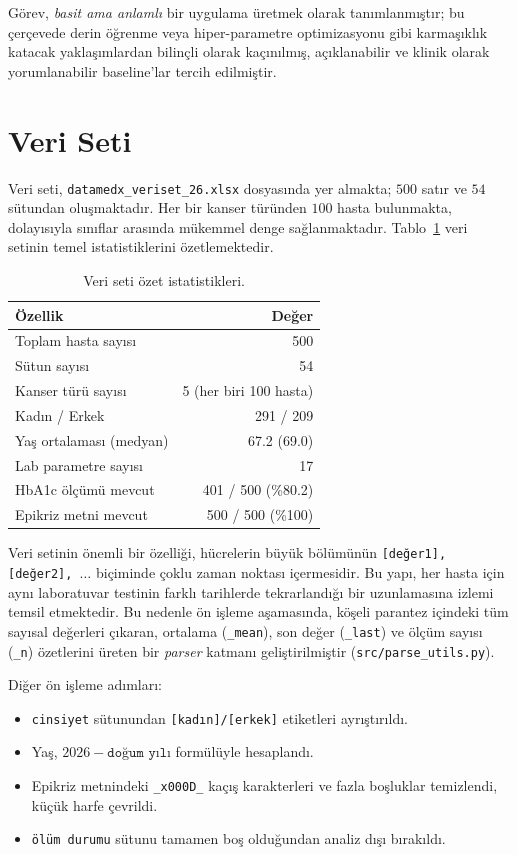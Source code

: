 \documentclass[11pt,a4paper]{article}
\begin{document}
Görev, \emph{basit ama anlamlı} bir uygulama üretmek olarak tanımlanmıştır; bu çerçevede derin öğrenme veya hiper-parametre optimizasyonu gibi karmaşıklık katacak yaklaşımlardan bilinçli olarak kaçınılmış, açıklanabilir ve klinik olarak yorumlanabilir baseline'lar tercih edilmiştir.

\section{Veri Seti}

Veri seti, \texttt{datamedx\_veriset\_26.xlsx} dosyasında yer almakta; $500$ satır ve $54$ sütundan oluşmaktadır. Her bir kanser türünden $100$ hasta bulunmakta, dolayısıyla sınıflar arasında mükemmel denge sağlanmaktadır. Tablo~\ref{tab:dataset} veri setinin temel istatistiklerini özetlemektedir.

\begin{table}[htbp]
\centering
\caption{Veri seti özet istatistikleri.}
\label{tab:dataset}
\small
\begin{tabular}{lr}
\toprule
\textbf{Özellik} & \textbf{Değer} \\
\midrule
Toplam hasta sayısı & 500 \\
Sütun sayısı & 54 \\
Kanser türü sayısı & 5 (her biri 100 hasta) \\
Kadın / Erkek & 291 / 209 \\
Yaş ortalaması (medyan) & 67.2 (69.0) \\
Lab parametre sayısı & 17 \\
HbA1c ölçümü mevcut & 401 / 500 (\%80.2) \\
Epikriz metni mevcut & 500 / 500 (\%100) \\
\bottomrule
\end{tabular}
\end{table}

Veri setinin önemli bir özelliği, hücrelerin büyük bölümünün \texttt{[değer1], [değer2], $\ldots$} biçiminde çoklu zaman noktası içermesidir. Bu yapı, her hasta için aynı laboratuvar testinin farklı tarihlerde tekrarlandığı bir uzunlamasına izlemi temsil etmektedir. Bu nedenle ön işleme aşamasında, köşeli parantez içindeki tüm sayısal değerleri çıkaran, ortalama (\texttt{\_mean}), son değer (\texttt{\_last}) ve ölçüm sayısı (\texttt{\_n}) özetlerini üreten bir \emph{parser} katmanı geliştirilmiştir (\texttt{src/parse\_utils.py}).

Diğer ön işleme adımları:
\begin{itemize}[leftmargin=1.5em,itemsep=1pt]
    \item \texttt{cinsiyet} sütunundan \texttt{[kadın]/[erkek]} etiketleri ayrıştırıldı.
    \item Yaş, $2026 - \texttt{doğum yılı}$ formülüyle hesaplandı.
    \item Epikriz metnindeki \texttt{\_x000D\_} kaçış karakterleri ve fazla boşluklar temizlendi, küçük harfe çevrildi.
    \item \texttt{ölüm durumu} sütunu tamamen boş olduğundan analiz dışı bırakıldı.
\end{itemize}
\end{document}
